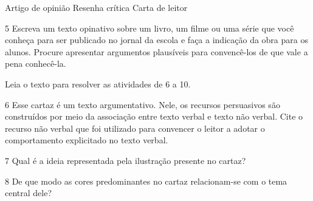 \begin{boxlist}
 Artigo de opinião
 Resenha crítica
 Carta de leitor
\end{boxlist}

\num{5} Escreva um texto opinativo sobre um livro, um filme ou uma série
que você conheça para ser publicado no jornal da escola e faça a
indicação da obra para os alunos. Procure apresentar argumentos
plausíveis para convencê-los de que vale a pena conhecê-la.


Leia o texto para resolver as atividades de 6 a 10.


\num{6} Esse cartaz é um texto argumentativo. Nele, os recursos
persuasivos são construídos por meio da associação entre texto verbal e
texto não verbal. Cite o recurso não verbal que foi utilizado para
convencer o leitor a adotar o comportamento explicitado no texto verbal.


\num{7} Qual é a ideia representada pela ilustração presente no cartaz?


\num{8} De que modo as cores predominantes no cartaz relacionam-se com o
tema central dele?


